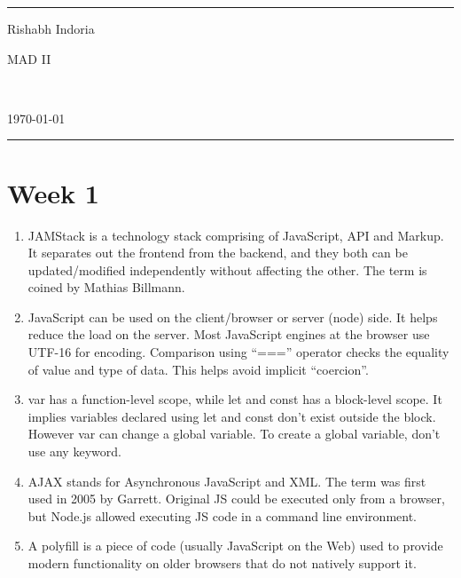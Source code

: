 \documentclass[a4paper]{article}
\begin{document}
\fancyhead[c]{}
\hrule \medskip
\begin{minipage}{0.295\textwidth}
\raggedright
Rishabh Indoria
\end{minipage}
\begin{minipage}{0.4\textwidth}
\centering
\LARGE
MAD II
\end{minipage}\
\begin{minipage}{0.295\textwidth}
\raggedleft
\today \hfill \\
\end{minipage}
\medskip \hrule
\bigskip

\section{Week 1}
\begin{enumerate}
    \item JAMStack  is a technology stack comprising of JavaScript, API and Markup.  It separates out the frontend from the backend, and they both can be updated/modified independently without affecting the other.  The term is coined by Mathias Billmann.
    \item JavaScript can be used on the client/browser or server (node) side.  It helps reduce the load on the server. Most JavaScript engines at the browser use UTF-16 for encoding. Comparison using “===” operator checks the equality of value and type of data.  This helps avoid implicit “coercion”.
    \item var  has a function-level  scope, while let and const  has a block-level scope.  It implies variables declared using let and const  don’t  exist outside the block. However var  can change a global variable. To create a global  variable, don’t use any keyword.
    \item AJAX stands for Asynchronous JavaScript and XML. The term was first used in 2005 by Garrett. Original JS could be executed only from a browser, but Node.js allowed executing JS code in a command line environment.
    \item A polyfill is a piece of code (usually JavaScript on the Web) used to provide modern functionality on older browsers that do not natively support it.
\end{enumerate}
\end{document}
